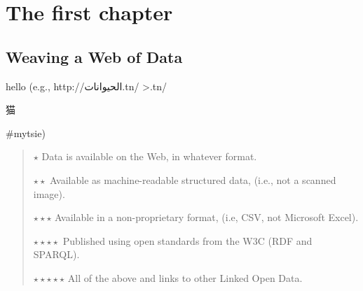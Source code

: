 \documentclass[times]{acm-book}%
\begin{document}
\chapter{The first chapter}
\label{ch5}

\section{Weaving a Web of Data}

hello
(e.g., http://\<الحيوانات.tn/ >.tn/\begin{CJK*}{UTF8}{gbsn}猫
\end{CJK*}\#mytsie)

\begin{quote}
$\star{}$ Data is available on the Web, in whatever format.

$\star{}\star{}$ Available as machine-readable structured data, (i.e., not a scanned
image).

$\star\star\star$ Available in a non-proprietary format, (i.e, CSV, not Microsoft
Excel).

$\star\star\star\star$ Published using open standards from the W3C (RDF and SPARQL).

$\star\star\star\star\star$ All of the above and links to other Linked Open Data.
\end{quote}
\end{document}
